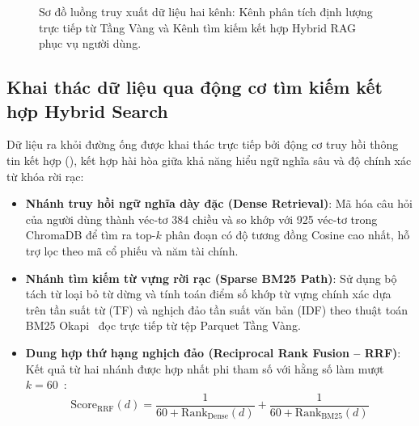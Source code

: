\begin{figure}[htbp]
    \caption{Sơ đồ luồng truy xuất dữ liệu hai kênh: Kênh phân tích định lượng trực tiếp từ Tầng Vàng và Kênh tìm kiếm kết hợp Hybrid RAG phục vụ người dùng.}
    \label{fig:retrieval_flow}
\end{figure}

\subsection{Khai thác dữ liệu qua động cơ tìm kiếm kết hợp Hybrid Search}
Dữ liệu ra khỏi đường ống được khai thác trực tiếp bởi động cơ truy hồi thông tin kết hợp (), kết hợp hài hòa giữa khả năng hiểu ngữ nghĩa sâu và độ chính xác từ khóa rời rạc:
\begin{itemize}
    \item \textbf{Nhánh truy hồi ngữ nghĩa dày đặc (Dense Retrieval)}: Mã hóa câu hỏi của người dùng thành véc-tơ 384 chiều và so khớp với 925 véc-tơ trong ChromaDB để tìm ra top-$k$ phân đoạn có độ tương đồng Cosine cao nhất, hỗ trợ lọc theo mã cổ phiếu và năm tài chính.
    \item \textbf{Nhánh tìm kiếm từ vựng rời rạc (Sparse BM25 Path)}: Sử dụng bộ tách từ loại bỏ từ dừng và tính toán điểm số khớp từ vựng chính xác dựa trên tần suất từ (TF) và nghịch đảo tần suất văn bản (IDF) theo thuật toán BM25 Okapi~\cite{robertson2009probabilistic} đọc trực tiếp từ tệp Parquet Tầng Vàng.
    \item \textbf{Dung hợp thứ hạng nghịch đảo (Reciprocal Rank Fusion -- RRF)}: Kết quả từ hai nhánh được hợp nhất phi tham số với hằng số làm mượt $k=60$~\cite{cormack2009reciprocal}:
    \begin{equation}
        \text{Score}_{\text{RRF}}(d) = \frac{1}{60 + \text{Rank}_{\text{Dense}}(d)} + \frac{1}{60 + \text{Rank}_{\text{BM25}}(d)}
    \end{equation}
\end{itemize}

